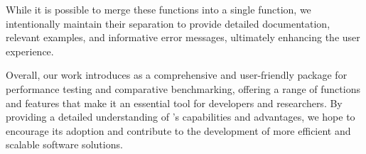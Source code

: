 While it is possible to merge these functions into a single function, we intentionally maintain their separation to provide detailed documentation, relevant examples, and informative error messages, ultimately enhancing the user experience.

Overall, our work introduces  as a comprehensive and user-friendly package for performance testing and comparative benchmarking, offering a range of functions and features that make it an essential tool for developers and researchers. By providing a detailed understanding of 's capabilities and advantages, we hope to encourage its adoption and contribute to the development of more efficient and scalable software solutions.



